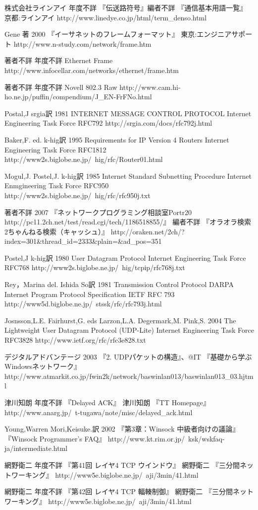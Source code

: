 \begin{thebibliography}{99}
\item
     株式会社ラインアイ
	年度不詳
	『伝送路符号』編者不詳 『通信基本用語一覧』
	京都:ラインアイ
     http://www.linedye.co.jp/html/term\_denso.html
\item
	Gene 著
	2000
	『イーサネットのフレームフォーマット』
	東京:エンジニアサポート
	http://www.n-study.com/network/frame.htm
\item
	著者不詳
	年度不詳
	Ethernet Frame
	http://www.infocellar.com/networks/ethernet/frame.htm
\item
	著者不詳
	年度不詳
	Novell 802.3 Raw
	http://www.cam.hi-ho.ne.jp/puffin/compendium/J\_EN-FrFNo.html
\item
      Postal,J
	srgia訳
	1981
	INTERNET MESSAGE CONTROL PROTOCOL Internet Engineering Task Force RFC792
     http://srgia.com/docs/rfc792j.html
\item
      Baker,F. ed. 
	k-hig訳
	1995
	Requirements for IP Version 4 Routers Internet Engineering Task Force RFC1812
     http://www2s.biglobe.ne.jp/~hig/rfc/Router01.html
\item
      Mogul,J. Postel,J.
	k-hig訳 
	1985
	Internet Standard Subnetting Procedure Internet Enmgineering Task Force RFC950
	http://www2s.biglobe.ne.jp/~hig/rfc/rfc950j.txt
\item
    著者不詳
	2007
	『ネットワークプログラミング相談室Portr20 http://pc11.2ch.net/test/read.cgi/tech/1186518855/』 
	編者不詳 
	『オラオラ検索 2ちゃんねる検索（キャッシュ）』
    http://oraken.net/2ch/?index=301\&thread\_id=2333\&plain=\&ad\_pos=351
\item
      Postel,J
	k-hig訳
	1980
	User Datagram Protocol Internet Engineering Task Force RFC768
     http://www2s.biglobe.ne.jp/~hig/tcpip/rfc768j.txt
\item
      Rey，Marina del.
	Ishida So訳
	1981
	Transmission Control Protocol DARPA Internet Program Protocol Specification IETF RFC 793
     http://www5d.biglobe.ne.jp/~stssk/rfc/rfc793j.html
\item
     Josnsson,L.E. Fairhurst,G. eds Larzon,L.A. Degermark,M. Pink,S.
	2004
	The Lightweight User Datagram Protocol (UDP-Lite) Internet Engineering Task Force RFC3828
     http://www.ietf.org/rfc/rfc3e828.txt
\item
     デジタルアドバンテージ
	2003
	『2. UDPパケットの構造』、@IT 『基礎から学ぶWindowsネットワーク』
     http://www.atmarkit.co.jp/fwin2k/network/baswinlan013/baswinlan013\_03.hjtml
\item
     津川知朗
	年度不詳 
	『Delayed ACK』
	津川知朗
	『TT Homepage』
     http://www.anarg.jp/~t-tugawa/note/misc/delayed\_ack.html
\item
      Young,Warren
	Mori,Keisuke.訳
	2002
	『第3章：Winsock 中級者向けの議論』 
	『Winsock Programmer's FAQ』
     http://www.kt.rim.or.jp/~ksk/wskfaq-ja/intermediate.html
\item
      網野衛二
	年度不詳
	『第41回 レイヤ4 TCP ウインドウ』
	網野衛二
	『三分間ネットワーキング』
     http://www5e.biglobe.ne.jp/~aji/3min/41.html
\item
      網野衛二
	年度不詳
	『第42回 レイヤ4 TCP 輻輳制御』
	網野衛二
	『三分間ネットワーキング』
     http://www5e.biglobe.ne.jp/~aji/3min/41.html


\end{thebibliography}
